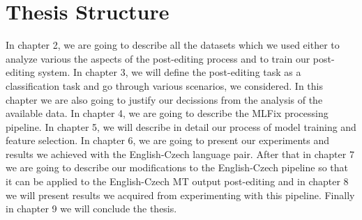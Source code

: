 
\section{Thesis Structure}


In chapter 2, we are going to describe all the datasets which we used
either to analyze various the aspects of the post-editing process and
to train our post-editing system.
In chapter 3, we will define the post-editing task as a classification
task and go through various scenarios, we considered. In this chapter
we are also going to justify our decissions from the analysis of the
available data.
In chapter 4, we are going to describe the MLFix processing pipeline.
In chapter 5, we will describe in detail our process of model training
and feature selection.
In chapter 6, we are going to present our experiments and results we
achieved with the English-Czech language pair.
After that in chapter 7 we are going to describe our modifications to the English-Czech
pipeline so that it can be applied to the English-Czech MT output post-editing and
in chapter 8 we will present results we acquired from experimenting with
this pipeline.
Finally in chapter 9 we will conclude the thesis.
